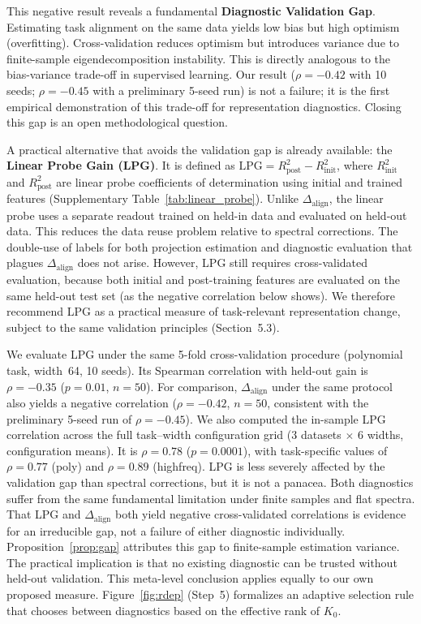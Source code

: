 \documentclass[twoside,11pt]{article}
\begin{document}
This negative result reveals a fundamental \textbf{Diagnostic Validation Gap}. Estimating task alignment on the same data yields low bias but high optimism (overfitting). Cross-validation reduces optimism but introduces variance due to finite-sample eigendecomposition instability. This is directly analogous to the bias-variance trade-off in supervised learning. Our result ($\rho=-0.42$ with 10 seeds; $\rho=-0.45$ with a preliminary 5-seed run) is not a failure; it is the first empirical demonstration of this trade-off for representation diagnostics. Closing this gap is an open methodological question.

A practical alternative that avoids the validation gap is already available: the \textbf{Linear Probe Gain (LPG)}. It is defined as $\text{LPG} = R^2_{\text{post}} - R^2_{\text{init}}$, where $R^2_{\text{init}}$ and $R^2_{\text{post}}$ are linear probe coefficients of determination using initial and trained features (Supplementary Table~\ref{tab:linear_probe}). Unlike $\Delta_{\text{align}}$, the linear probe uses a separate readout trained on held-in data and evaluated on held-out data. This reduces the data reuse problem relative to spectral corrections. The double-use of labels for both projection estimation and diagnostic evaluation that plagues $\Delta_{\text{align}}$ does not arise.  However, LPG still requires cross-validated evaluation, because both initial and post-training features are evaluated on the same held-out test set (as the negative correlation below shows).  We therefore recommend LPG as a practical measure of task-relevant representation change, subject to the same validation principles (Section~5.3).

We evaluate LPG under the same 5-fold cross-validation procedure (polynomial task, width~64, 10 seeds). Its Spearman correlation with held-out gain is $\rho=-0.35$ ($p=0.01$, $n=50$). For comparison, $\Delta_{\text{align}}$ under the same protocol also yields a negative correlation ($\rho=-0.42$, $n=50$, consistent with the preliminary 5-seed run of $\rho=-0.45$). We also computed the in-sample LPG correlation across the full task--width configuration grid (3 datasets $\times$ 6 widths, configuration means). It is $\rho=0.78$ ($p=0.0001$), with task-specific values of $\rho=0.77$ (poly) and $\rho=0.89$ (highfreq). LPG is less severely affected by the validation gap than spectral corrections, but it is not a panacea. Both diagnostics suffer from the same fundamental limitation under finite samples and flat spectra. That LPG and $\Delta_{\text{align}}$ both yield negative cross-validated correlations is evidence for an irreducible gap, not a failure of either diagnostic individually. Proposition~\ref{prop:gap} attributes this gap to finite-sample estimation variance. The practical implication is that no existing diagnostic can be trusted without held-out validation. This meta-level conclusion applies equally to our own proposed measure. Figure~\ref{fig:rdep} (Step~5) formalizes an adaptive selection rule that chooses between diagnostics based on the effective rank of $K_0$.
\end{document}
